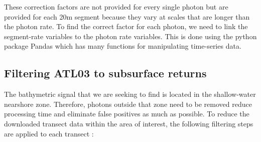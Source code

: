 These correction factors are not provided for every single photon but are provided for each 20m segment because they vary at scales that are longer than the photon rate. To find the correct factor for each photon, we need to link the segment-rate variables to the photon rate variables. This is done using the python package Pandas \parencite{jeff_reback_2022_6408044,mckinney-proc-scipy-2010} which has many functions for manipulating time-series data. 

\subsection{Filtering ATL03 to subsurface returns}

The bathymetric signal that we are seeking to find is located in the shallow-water nearshore zone. Therefore, photons outside that zone need to be removed reduce processing time and eliminate false positives as much as possible. To reduce the downloaded transect data within the area of interest, the following filtering steps are applied to each transect :

